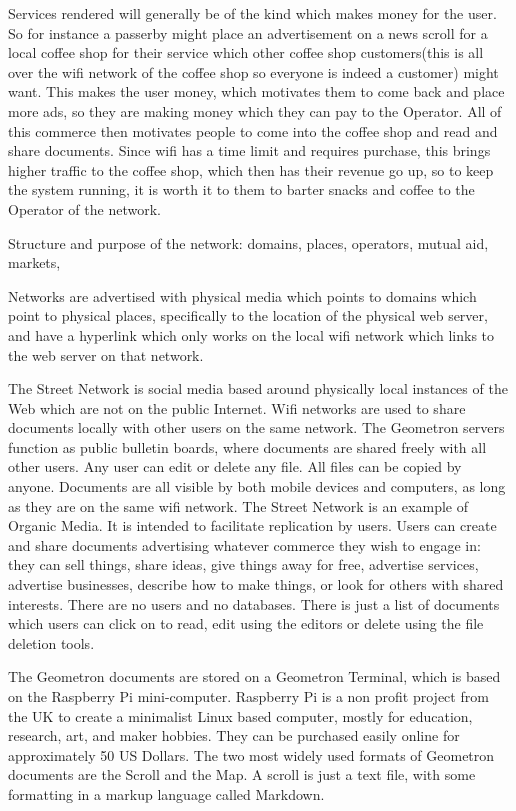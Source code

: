 Services rendered will generally be of the kind which makes money for the user.  So for instance a passerby might place an advertisement on a news scroll for a local coffee shop for their service which other coffee shop customers(this is all over the wifi network of the coffee shop so everyone is indeed a customer) might want.  This makes the user money, which motivates them to come back and place more ads, so they are making money which they can pay to the Operator.  All of this commerce then motivates people to come into the coffee shop and read and share documents.  Since wifi has a time limit and requires purchase, this brings higher traffic to the coffee shop, which then has their revenue go up, so to keep the system running, it is worth it to them to barter snacks and coffee to the Operator of the network.  

Structure and purpose of the network: domains, places, operators, mutual aid, markets, 

Networks are advertised with physical media which points to domains which point to physical places, specifically to the location of the physical web server, and have a hyperlink which only works on the local wifi network which links to the web server on that network.

The Street Network is social media based around physically local instances of the Web which are not on the public Internet.  Wifi networks are used to share documents locally with other users on the same network.  The Geometron servers function as public bulletin boards, where documents are shared freely with all other users. Any user can edit or delete any file. All files can be copied by anyone.  Documents are all visible by both mobile devices and computers, as long as they are on the same wifi network.  The Street Network is an example of Organic Media. It is intended to facilitate replication by users.  Users can create and share documents advertising whatever commerce they wish to engage in: they can sell things, share ideas, give things away for free, advertise services, advertise businesses, describe how to make things, or look for others with shared interests.  There are no users and no databases.  There is just a list of documents which users can click on to read, edit using the editors or delete using the file deletion tools.

The Geometron documents are stored on a Geometron Terminal, which is based on the Raspberry Pi mini-computer.  Raspberry Pi is a non profit project from the UK to create a minimalist Linux based computer, mostly for education, research, art, and maker hobbies.   They can be purchased easily online for approximately 50 US Dollars.  The two most widely used formats of Geometron documents are the Scroll and the Map.  A scroll is just a text file, with some formatting in a markup language called Markdown.

